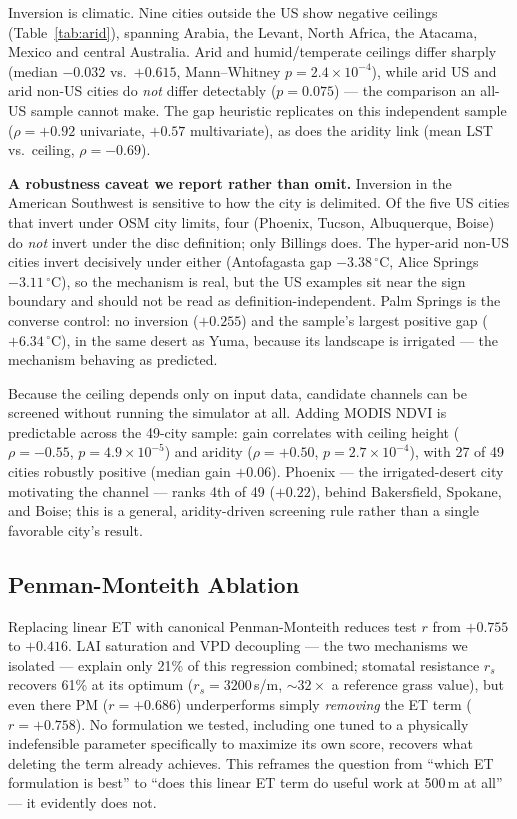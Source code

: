 \documentclass[conference]{IEEEtran}
\begin{document}
Inversion is climatic. Nine cities outside the US show negative ceilings
(Table~\ref{tab:arid}), spanning Arabia, the Levant, North Africa, the
Atacama, Mexico and central Australia. Arid and humid/temperate ceilings
differ sharply (median $-0.032$ vs.\ $+0.615$, Mann--Whitney
$p{=}2.4{\times}10^{-4}$), while arid US and arid non-US cities do
\emph{not} differ detectably ($p{=}0.075$) --- the comparison an all-US
sample cannot make. The gap heuristic replicates on this independent
sample ($\rho{=}{+}0.92$ univariate, $+0.57$ multivariate), as does the
aridity link (mean LST vs.\ ceiling, $\rho{=}{-}0.69$).

\textbf{A robustness caveat we report rather than omit.} Inversion in the
American Southwest is sensitive to how the city is delimited. Of the five
US cities that invert under OSM city limits, four (Phoenix, Tucson,
Albuquerque, Boise) do \emph{not} invert under the disc definition; only
Billings does. The hyper-arid non-US cities invert decisively under either
(Antofagasta gap $-3.38$\,$^{\circ}$C, Alice Springs $-3.11$\,$^{\circ}$C), so the
mechanism is real, but the US examples sit near the sign boundary and
should not be read as definition-independent. Palm Springs is the
converse control: no inversion ($+0.255$) and the sample's largest
positive gap ($+6.34$\,$^{\circ}$C), in the same desert as Yuma, because its
landscape is irrigated --- the mechanism behaving as predicted.

Because the ceiling depends only on input data, candidate channels can be
screened without running the simulator at all. Adding MODIS NDVI is
predictable across the 49-city sample: gain correlates with ceiling
height ($\rho{=}{-}0.55$, $p{=}4.9\times10^{-5}$) and aridity
($\rho{=}{+}0.50$, $p{=}2.7\times10^{-4}$), with 27 of 49 cities robustly
positive (median gain $+0.06$). Phoenix --- the irrigated-desert city
motivating the channel --- ranks 4th of 49 ($+0.22$), behind Bakersfield,
Spokane, and Boise; this is a general, aridity-driven screening rule
rather than a single favorable city's result.

\subsection{Penman-Monteith Ablation}
Replacing linear ET with canonical Penman-Monteith reduces test $r$ from
$+0.755$ to $+0.416$. LAI saturation and VPD decoupling --- the two
mechanisms we isolated --- explain only 21\% of this regression combined;
stomatal resistance $r_s$ recovers 61\% at its optimum
($r_s{=}3200$\,s/m, $\sim32\times$ a reference grass value), but even
there PM ($r{=}{+}0.686$) underperforms simply \emph{removing} the ET
term ($r{=}{+}0.758$). No formulation we tested,
including one tuned to a physically indefensible parameter specifically
to maximize its own score, recovers what deleting the term already
achieves. This reframes the question from ``which ET formulation is
best'' to ``does this linear ET term do useful work at 500\,m at all'' ---
it evidently does not.
\end{document}
